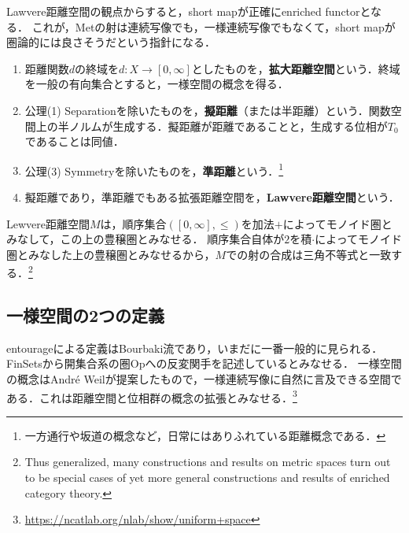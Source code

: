 \documentclass[uplatex,dvipdfmx]{jsreport}
\begin{document}
\begin{tcolorbox}[colframe=ForestGreen, colback=ForestGreen!10!white,breakable,colbacktitle=ForestGreen!40!white,coltitle=black,fonttitle=\bfseries\sffamily,
    title=]
        Lawvere距離空間の観点からすると，short mapが正確にenriched functorとなる．
        これが，Metの射は連続写像でも，一様連続写像でもなくて，short mapが圏論的には良さそうだという指針になる．
\end{tcolorbox}

\begin{definition}\mbox{}
    \begin{enumerate}
        \item 距離関数$d$の終域を$d:X\to[0,\infty]$としたものを，\textbf{拡大距離空間}という．終域を一般の有向集合とすると，一様空間の概念を得る．
        \item 公理(1) Separationを除いたものを，\textbf{擬距離}（または半距離）という．関数空間上の半ノルムが生成する．擬距離が距離であることと，生成する位相が$T_0$であることは同値．
        \item 公理(3) Symmetryを除いたものを，\textbf{準距離}という．\footnote{一方通行や坂道の概念など，日常にはありふれている距離概念である．}
        \item 擬距離であり，準距離でもある拡張距離空間を，\textbf{Lawvere距離空間}という．
    \end{enumerate}
\end{definition}

\begin{lemma}
    Lewvere距離空間$M$は，順序集合$([0,\infty],\le)$を加法$+$によってモノイド圏とみなして，この上の豊穣圏とみなせる．
    順序集合自体が$2$を積$\cdot$によってモノイド圏とみなした上の豊穣圏とみなせるから，$M$での射の合成は三角不等式と一致する．\footnote{Thus generalized, many constructions and results on metric spaces turn out to be special cases of yet more general constructions and results of enriched category theory. }
\end{lemma}

\subsection{一様空間の2つの定義}


\begin{tcolorbox}[colframe=ForestGreen, colback=ForestGreen!10!white,breakable,colbacktitle=ForestGreen!40!white,coltitle=black,fonttitle=\bfseries\sffamily,
    title=一様収束の概念による距離空間の一般化である]
    entourageによる定義はBourbaki流であり，いまだに一番一般的に見られる．FinSetsから開集合系の圏Opへの反変関手を記述しているとみなせる．
    一様空間の概念はAndré Weilが提案したもので，一様連続写像に自然に言及できる空間である．これは距離空間と位相群の概念の拡張とみなせる．\footnote{\url{https://ncatlab.org/nlab/show/uniform+space}}
\end{tcolorbox}
\end{document}
